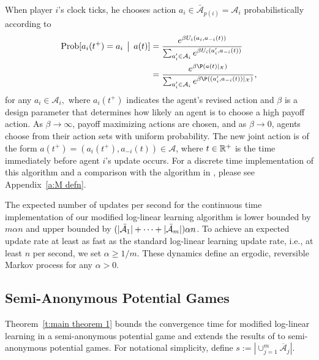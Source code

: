 When player $i$'s clock ticks, he chooses action $a_i\in \bar{\mathcal{A}}_{p(i)} = \mathcal{A}_i$ probabilistically according to
\begin{align}\label{e:logit response}
{\rm Prob}[a_i(t^+) = a_i\given a(t)]  &=  \frac{e^{\beta U_i(a_i,a_{-i}(t))}}{\sum_{a_i^{\prime} \in\mathcal{A}_i}e^{\beta U_i(a_i^\prime,a_{-i}(t))}} \nonumber\\
&=  \frac{e^{\beta\P(a(t)|_\X)}}{\sum_{a_i^{\prime} \in\mathcal{A}_i} e^{\beta\P((a_i^{\prime},a_{-i}(t))|_\X)}},
\end{align}
for any $a_i\in \mathcal{A}_i,$ where $a_i(t^+)$ indicates the agent's revised action and $\beta$ is a design parameter that determines how likely an agent is to choose a high payoff action. As $\beta\to \infty$, payoff maximizing actions are chosen, and as $\beta\to 0$, agents choose from their action sets with uniform probability.  The new joint action is of the form $a(t^+) = (a_i(t^+), a_{-i}(t))\in \mathcal{A}$, where $t\in\mathbb{R}^+$ is the time immediately before agent $i$'s update occurs. For a discrete time implementation of this algorithm and a comparison with the algorithm in \cite{Shah2010}, please see Appendix~\ref{a:M defn}.


The expected number of updates per second for the continuous time implementation of our modified log-linear learning algorithm is lower bounded by $m\alpha n$ and upper bounded by $(|\bar{{\cal A}}_1| + \dots + |\bar{{\cal A}}_m|) \alpha n$.  
To achieve an expected update rate at least as fast as the standard log-linear learning update rate, i.e., at least $n$ per second, we set $\alpha \geq 1/m$.  These dynamics define an ergodic, reversible Markov process for any $\alpha>0$.  

\subsection{Semi-Anonymous Potential Games}\label{s:main theorem 1}

Theorem~\ref{t:main theorem 1} bounds the convergence time for modified log-linear learning in a semi-anonymous potential game and extends the results of \cite{Shah2010} to semi-anonymous potential games. For notational simplicity, define $s:= |\cup_{j= 1}^m \overline{\mathcal{A}}_j|.$  

